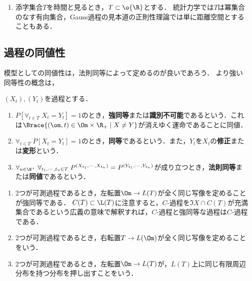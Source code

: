 \documentclass[uplatex,dvipdfmx]{jsreport}
\begin{document}
\begin{remark}[確率過程とは何か]
    \begin{enumerate}
        \item 添字集合$T$を時間と見るとき，$T\subset\o{\R}$とする．
        統計力学では$T$は冪集合のなす有向集合，Gauss過程の見本道の正則性理論では単に距離空間とすることもある．
    \end{enumerate}
\end{remark}

\subsection{過程の同値性}

\begin{tcolorbox}[colframe=ForestGreen, colback=ForestGreen!10!white,breakable,colbacktitle=ForestGreen!40!white,coltitle=black,fonttitle=\bfseries\sffamily,
title=]
    模型としての同値性は，法則同等によって定めるのが良いであろう．
    より強い同等性の概念は，
\end{tcolorbox}

\begin{definition}
    $(X_t),(Y_t)$を過程とする．
    \begin{enumerate}
        \item $P[\forall_{t\in T}\;X_t=Y_t]=1$のとき，\textbf{強同等}または\textbf{識別不可能}であるという．これは$\Brace{(\om,t)\in\Om\times\R_+\mid X\ne Y}$が消えゆく運命であることに同値．
        \item $\forall_{t\in T}\;P[X_t=Y_t]=1$のとき，\textbf{同等}であるという．また，$Y_t$を$X_t$の\textbf{修正}または\textbf{変形}という．
        \item $\forall_{n\in\N^+}\;\forall_{t_1,\cdots,t_n\in T}\;P^{(X_{t_1},\cdots,X_{t_n})}=P^{(Y_{t_1},\cdots,Y_{t_n})}$が成り立つとき，\textbf{法則同等}または\textbf{同値}であるという．
    \end{enumerate}
\end{definition}
\begin{remarks}\mbox{}
    \begin{enumerate}
        \item 2つが可測過程であるとき，左転置$\Om\to L(T)$が全く同じ写像を定めることが強同等である．
        $C(T)\subset\L(T)$に注意すると，$C$-過程を$\Im X\cap C(T)$が充満集合であるという広義の意味で解釈すれば，$C$-過程と強同等な過程は$C$-過程である．
        \item 2つが可測過程であるとき，右転置$T\to L(\Om)$が全く同じ写像を定めることをいう．
        \item 2つが可測過程であるとき，左転置$\Om\to L(T)$が，$L(T)$上に同じ有限周辺分布を持つ分布を押し出すことをいう．
    \end{enumerate}
\end{remarks}
\end{document}
